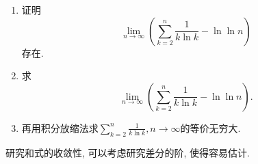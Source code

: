 \documentclass[../../main.tex]{subfiles}%
\begin{document}
\begin{example}\label{example:例题8.5021514}
\begin{enumerate}
\item 证明
\[
\lim_{n \to \infty} \left( \sum\limits_{k=2}^n \frac{1}{k \ln k} - \ln \ln n \right)
\]
存在.

\item 求
\[
\lim_{n \to \infty} \left( \sum\limits_{k=2}^n \frac{1}{k \ln k} - \ln \ln n \right).
\]

\item 再用积分放缩法求\(\sum\limits_{k = 2}^{n}\frac{1}{k\ln k},n\to\infty\)的等价无穷大.
\end{enumerate}
\end{example}
\begin{note}
研究和式的收敛性, 可以考虑研究差分的阶, 使得容易估计.
\end{note}
\end{document}
